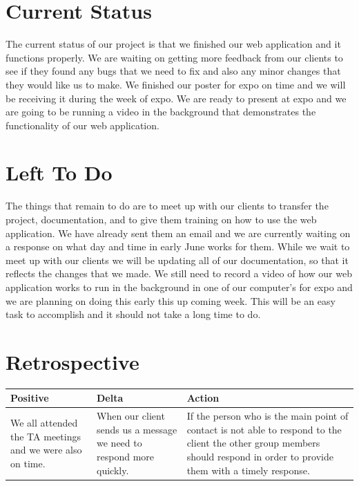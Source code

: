 \documentclass[letterpaper,10pt,serif,draftclsnofoot,onecolumn,compsoc,titlepage]{IEEEtran}
\begin{document}
\section{Current Status}
The current status of our project is that we finished our web application and it functions properly. We are waiting on getting more feedback from our clients to see if they found any bugs that we need to fix and also any minor changes that they would like us to make. We finished our poster for expo on time and we will be receiving it during the week of expo. We are ready to present at expo and we are going to be running a video in the background that demonstrates the functionality of our web application. 

\section{Left To Do}
The things that remain to do are to meet up with our clients to transfer the project, documentation, and to give them training on how to use the web application. We have already sent them an email and we are currently waiting on a response on what day and time in early June works for them. While we wait to meet up with our clients we will be updating all of our documentation, so that it reflects the changes that we made. We still need to record a video of how our web application works to run in the background in one of our computer's for expo and we are planning on doing this early this up coming week. This will be an easy task to accomplish and it should not take a long time to do.

\section{Retrospective}
\begin{center}
    \begin{tabular}{ | p{5cm} | p{5cm} | p{5cm} |}
    \hline
     Positive & Delta & Action \\ \hline
     We all attended the TA meetings and we were also on time. & When our client sends us a message we need to respond more quickly. & If the person who is the main point of contact is not able to respond to the client the other group members should respond in order to provide them with a timely response. \\ \hline

     

     
    \end{tabular}
\end{center}
\end{document}
